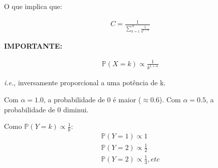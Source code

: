 \documentclass[11pt,a4paper]{book}
\begin{document}
\begin{itemize}
		O que implica que:
		
		\begin{eqnarray*}
			C=\frac{1}{\sum_{k=1}^N\frac{1}{k^{1+\alpha}}}
		\end{eqnarray*}
		
		\textbf{IMPORTANTE:} 
		
		\begin{eqnarray*}
			\mathbb{P}(X=k)\propto\frac{1}{k^{1+\alpha}}
		\end{eqnarray*}
		
		\textit{i.e.}, inversamente proporcional a uma potência de k.
		
		Com $\alpha=1.0$, a probabilidade de 0 é maior ($\approx 0.6$).
		Com $\alpha=0.5$, a probabilidade de 0 diminui.
		
		Como $\mathbb{P}(Y=k)\propto\frac{1}{k}$:
		\begin{eqnarray*}
			\mathbb{P}(Y=1)\propto 1\\
			\mathbb{P}(Y=2)\propto\frac{1}{2}\\
			\mathbb{P}(Y=2)\propto\frac{1}{3}, etc
		\end{eqnarray*}
	\end{itemize}
\end{document}
